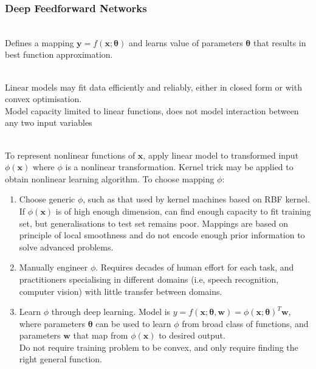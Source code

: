 \subsubsection{Deep Feedforward Networks}

\begin{remark} \\
Defines a mapping $\bm{y} = f(\bm{x}; \bm{\theta})$ and learns value of parameters $\bm{\theta}$ that results in best function approximation.
\end{remark}

\begin{remark} \\
Linear models may fit data efficiently and reliably, either in closed form or with convex optimisation.\\
Model capacity limited to linear functions, does not model interaction between any two input variables
\end{remark}

\begin{remark} \\
To represent nonlinear functions of $\bm{x}$, apply linear model to transformed input $\phi(\bm{x})$ where $\phi$ is a nonlinear transformation. Kernel trick may be applied to obtain nonlinear learning algorithm. To choose mapping $\phi$:
\begin{enumerate}[label=\roman*.]
\setlength{\itemsep}{0pt}
\item Choose generic $\phi$, such as that used by kernel machines based on RBF kernel.\\
If $\phi(\bm{x})$ is of high enough dimension, can find enough capacity to fit training set, but generalisations to test set remains poor. Mappings are based on principle of local smoothness and do not encode enough prior information to solve advanced problems.
\item Manually engineer $\phi$. Requires decades of human effort for each task, and practitioners specialising in different domains (i.e, speech recognition, computer vision) with little transfer between domains.
\item Learn $\phi$ through deep learning. Model is $y = f(\bm{x}; \bm{\theta}, \bm{w}) = \phi(\bm{x}; \bm{\theta})^T \bm{w}$, where parameters $\bm{\theta}$ can be used to learn $\phi$ from broad class of functions, and parameters $\bm{w}$ that map from $\phi(\bm{x})$ to desired output.\\
Do not require training problem to be convex, and only require finding the right general function.
\end{enumerate}
\end{remark}

